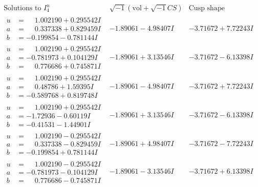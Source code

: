 \documentclass[1p]{elsarticle_modified}
\theoremstyle{definition}
\newcommand{\I}{\sqrt{-1}}
\begin{document}
$$\begin{array}{c|c|c}  
\text{Solutions to }I^u_{4}& \I (\text{vol} + \sqrt{-1}CS) & \text{Cusp shape}\\
 \hline 
\begin{aligned}
u &= \phantom{-}1.002190 + 0.295542 I \\
a &= \phantom{-}0.337338 + 0.829459 I \\
b &= -0.199854 - 0.781144 I\end{aligned}
 & -1.89061 - 4.98407 I & -3.71672 + 7.72243 I \\ \hline\begin{aligned}
u &= \phantom{-}1.002190 + 0.295542 I \\
a &= -0.781973 + 0.104129 I \\
b &= \phantom{-}0.776686 + 0.745871 I\end{aligned}
 & -1.89061 + 3.13546 I & -3.71672 - 6.13398 I \\ \hline\begin{aligned}
u &= \phantom{-}1.002190 + 0.295542 I \\
a &= \phantom{-}0.48786 + 1.59395 I \\
b &= -0.589768 + 0.819748 I\end{aligned}
 & -1.89061 - 4.98407 I & -3.71672 + 7.72243 I \\ \hline\begin{aligned}
u &= \phantom{-}1.002190 + 0.295542 I \\
a &= -1.72936 - 0.60119 I \\
b &= -0.41531 - 1.44901 I\end{aligned}
 & -1.89061 + 3.13546 I & -3.71672 - 6.13398 I \\ \hline\begin{aligned}
u &= \phantom{-}1.002190 - 0.295542 I \\
a &= \phantom{-}0.337338 - 0.829459 I \\
b &= -0.199854 + 0.781144 I\end{aligned}
 & -1.89061 + 4.98407 I & -3.71672 - 7.72243 I \\ \hline\begin{aligned}
u &= \phantom{-}1.002190 - 0.295542 I \\
a &= -0.781973 - 0.104129 I \\
b &= \phantom{-}0.776686 - 0.745871 I\end{aligned}
 & -1.89061 - 3.13546 I & -3.71672 + 6.13398 I \\ \hline\begin{aligned}

\end{aligned}
\end{array}$$
\end{document}
